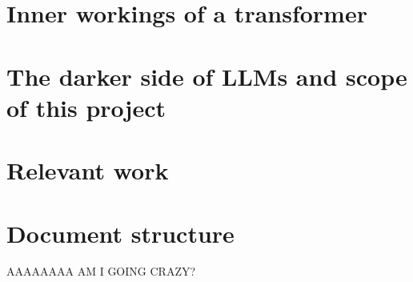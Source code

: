 
\section{Inner workings of a transformer}

\section{The darker side of LLMs and scope of this project}

\section{Relevant work}

\section{Document structure}
AAAAAAAA AM I GOING CRAZY?